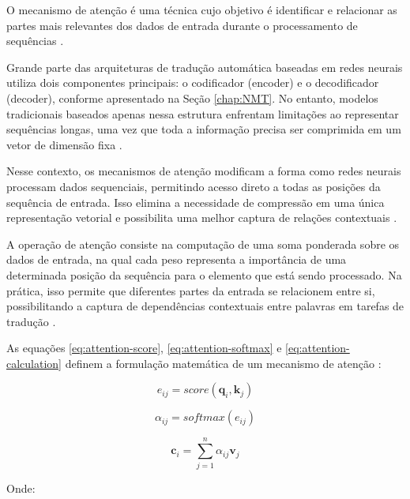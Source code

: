 O mecanismo de atenção é uma técnica cujo objetivo é identificar e relacionar
as partes mais relevantes dos dados de entrada durante o processamento de
sequências \cite{hays2026attentionmechanismsneuralnetworks}.

Grande parte das arquiteturas de tradução automática baseadas em redes neurais
utiliza dois componentes principais: o codificador (encoder) e o decodificador
(decoder), conforme apresentado na Seção \ref{chap:NMT}. No entanto, modelos
tradicionais baseados apenas nessa estrutura enfrentam limitações ao
representar sequências longas, uma vez que toda a informação precisa ser
comprimida em um vetor de dimensão fixa \cite{hays2026attentionmechanismsneuralnetworks}.

Nesse contexto, os mecanismos de atenção modificam a forma como redes neurais
processam dados sequenciais, permitindo acesso direto a todas as posições da
sequência de entrada. Isso elimina a necessidade de compressão em uma única
representação vetorial e possibilita uma melhor captura de relações
contextuais \cite{hays2026attentionmechanismsneuralnetworks}.

A operação de atenção consiste na computação de uma soma ponderada sobre os
dados de entrada, na qual cada peso representa a importância de uma determinada
posição da sequência para o elemento que está sendo processado. Na prática,
isso permite que diferentes partes da entrada se relacionem entre si,
possibilitando a captura de dependências contextuais entre palavras em tarefas
de tradução \cite{hays2026attentionmechanismsneuralnetworks}.

As equações \ref{eq:attention-score}, \ref{eq:attention-softmax} e \ref{eq:attention-calculation} definem a formulação matemática de um mecanismo de atenção
\cite{hays2026attentionmechanismsneuralnetworks}:

\begin{equation}
    e_{ij} = score(\mathbf{q}_i, \mathbf{k}_j)
    \label{eq:attention-score}
\end{equation}

\begin{equation}
    \alpha_{ij} = softmax(e_{ij})
    \label{eq:attention-softmax}
\end{equation}

\begin{equation}
    \mathbf{c}_i = \sum_{j=1}^{n} \alpha_{ij} \mathbf{v}_j
    \label{eq:attention-calculation}
\end{equation}

Onde:

